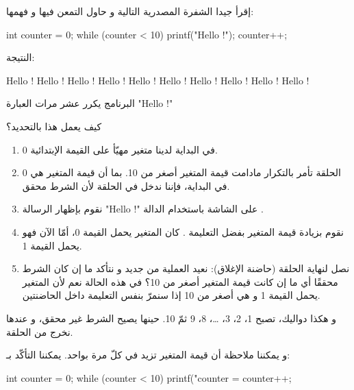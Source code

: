 إقرأ جيدا الشفرة المصدرية التالية و حاول التمعن فيها و فهمها:

\begin{Csource}
int counter = 0;
while (counter < 10)
{
	printf("Hello !\n");
	counter++;
}
\end{Csource}

النتيجة:

\begin{Console}
Hello !
Hello !
Hello !
Hello !
Hello !
Hello !
Hello !
Hello !
Hello !
Hello !
\end{Console}

البرنامج يكرر عشر مرات العبارة
"\textenglish{Hello !}"

\begin{question}
كيف يعمل هذا بالتحديد؟
\end{question}

\begin{enumerate}
	\item في البداية لدينا متغير 
	مهيّأ على القيمة الإبتدائية 0.
	\item الحلقة 
تأمر بالتكرار مادامت قيمة المتغير
أصغر من 10. بما أن قيمة المتغير 
هي 0 في البداية، فإننا ندخل في الحلقة لأن الشرط محقق.
	\item نقوم بإظهار الرسالة 
	"\textenglish{Hello !}"
على الشاشة باستخدام الدالة 
.
	\item نقوم بزيادة قيمة المتغير 
بفضل التعليمة 
	.
كان المتغير
يحمل القيمة 0، أمّا الآن فهو يحمل القيمة 1.
	\item نصل لنهاية الحلقة (حاضنة الإغلاق): نعيد العملية من جديد و نتأكد ما إن كان الشرط محققًا أي ما إن كانت قيمة المتغير أصغر من 10؟ في هذه الحالة نعم لأن المتغير
	يحمل القيمة 1 و هي أصغر من 10 إذا سنمرّ بنفس التعليمة داخل الحاضنتين.
\end{enumerate}

و هكذا دواليك،
تصبح 1، 2، 3، \dots، 8، 9 ثمّ 10. حينها يصيح الشرط 
غير محقق، و عندها نخرج من الحلقة.

و يمكننا ملاحظة أن قيمة المتغير
 تزيد في كلّ مرة بواحد. يمكننا التأكّد بـ:

\begin{Csource}
int counter = 0;
while (counter < 10)
{
	printf("counter = %
	counter++;
}
\end{Csource}

